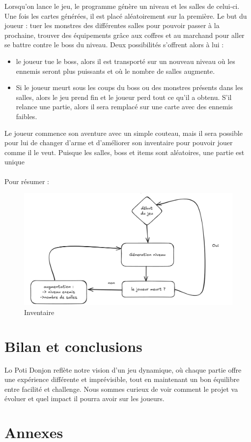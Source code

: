 \documentclass[a4paper,11pt]{article}
\begin{document}
Lorsqu'on lance le jeu, le programme génère un niveau et les salles de celui-ci. 
Une fois les cartes générées, il est placé aléatoirement sur la première. Le but du joueur : tuer les monstres des différentes salles pour pouvoir passer à la prochaine, 
trouver des équipements grâce aux coffres et au marchand pour aller se battre contre le boss du niveau. Deux possibilités s'offrent alors à lui :
\begin{itemize}
    \item le joueur tue le boss, alors il est transporté sur un nouveau niveau où les ennemis seront plus puissants et où le nombre de salles augmente.
    \item Si le joueur meurt sous les coups du boss ou des monstres présents dans les salles, alors le jeu prend fin et le joueur perd tout ce qu'il a obtenu. S'il relance une partie, alors il sera remplacé sur une carte avec des ennemis faibles.
\end{itemize}
Le joueur commence son aventure avec un simple couteau, mais il sera possible pour lui de changer d'arme et d'améliorer son inventaire pour pouvoir jouer comme il le veut. Puisque les salles, boss et items sont aléatoires, une partie est unique
\\\\
Pour résumer : 
\begin{figure}[ht] 
    \centering 
    \includegraphics[width=0.4\linewidth]{./img/scchemaCycleJeu.png} 
    \caption{Inventaire} 
\end{figure} 

\section{Bilan et conclusions}

Lo Poti Donjon reflète notre vision d'un jeu dynamique, où chaque partie offre une expérience différente et imprévisible, tout en maintenant un bon équilibre entre facilité et challenge. Nous sommes curieux de voir comment le projet va évoluer et quel impact il pourra avoir sur les joueurs.

\section{Annexes}
\end{document}
